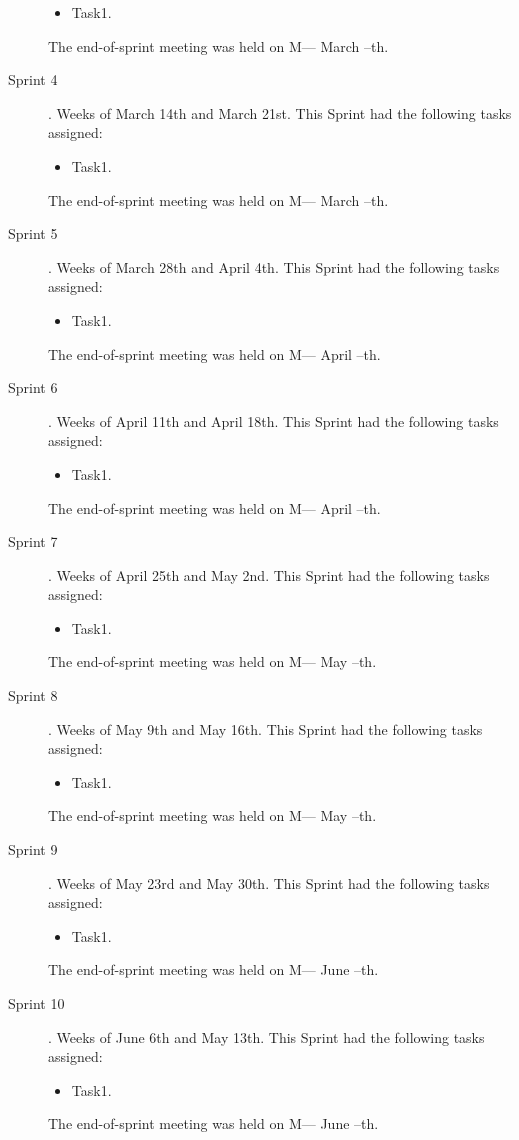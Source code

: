\begin{description}
\begin{itemize}
		\item Task1.
	\end{itemize}
	The end-of-sprint meeting was held on M--- March --th.
	\item[Sprint 4]. Weeks of March 14th and March 21st. This Sprint had the following tasks assigned:
	\begin{itemize}
		\item Task1.
	\end{itemize}
	The end-of-sprint meeting was held on M--- March --th.
	\item[Sprint 5]. Weeks of March 28th and April 4th. This Sprint had the following tasks assigned:
	\begin{itemize}
		\item Task1.
	\end{itemize}
	The end-of-sprint meeting was held on M--- April --th.
	\item[Sprint 6]. Weeks of April 11th and April 18th. This Sprint had the following tasks assigned:
	\begin{itemize}
		\item Task1.
	\end{itemize}
	The end-of-sprint meeting was held on M--- April --th.
	\item[Sprint 7]. Weeks of April 25th and May 2nd. This Sprint had the following tasks assigned:
	\begin{itemize}
		\item Task1.
	\end{itemize}
	The end-of-sprint meeting was held on M--- May --th.
	\item[Sprint 8]. Weeks of May 9th and May 16th. This Sprint had the following tasks assigned:
	\begin{itemize}
		\item Task1.
	\end{itemize}
	The end-of-sprint meeting was held on M--- May --th.
	\item[Sprint 9]. Weeks of May 23rd and May 30th. This Sprint had the following tasks assigned:
	\begin{itemize}
		\item Task1.
	\end{itemize}
	The end-of-sprint meeting was held on M--- June --th.
	\item[Sprint 10]. Weeks of June 6th and May 13th. This Sprint had the following tasks assigned:
	\begin{itemize}
		\item Task1.
	\end{itemize}
	The end-of-sprint meeting was held on M--- June --th.
\end{description}

